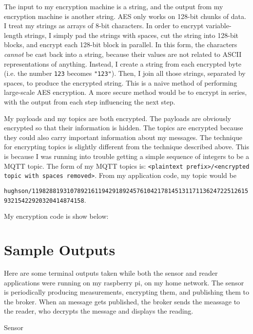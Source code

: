\documentclass[final,titlepage,onecolumn]{article}
\begin{document}
The input to my encryption machine is a string, and the output from my encryption machine is another string. AES only works on 128-bit chunks of data. I treat my strings as arrays of 8-bit characters.  In order to encrypt variable-length strings, I simply pad the strings with spaces, cut the string into 128-bit blocks, and encrypt each 128-bit block in parallel. In this form, the characters \emph{cannot} be cast back into a string, because their values are not related to ASCII representations of anything. Instead, I create a string from each encrypted byte (i.e. the number \texttt{123} becomes \texttt{"123"}). Then, I join all those strings, separated by spaces, to produce the encrypted string. This is a naive method of performing large-scale AES encryption. A more secure method would be to encrypt in series, with the output from each step influencing the next step.

My payloads and my topics are both encrypted. The payloads are obviously encrypted so that their information is hidden. The topics are encrypted because they could also carry important information about my messages. The technique for encrypting topics is slightly different from the technique described above. This is because I was running into trouble getting a simple sequence of integers to be a MQTT topic. The form of my MQTT topics is: \texttt{<plaintext prefix>/<encrypted topic with spaces removed>}. From my application code, my topic would be

\texttt{hughson/1198288193107892161194291892457610421781451311711362472251261593215422920320414874158}.

My encryption code is show below:
\lstset{style=Cpp}


\section{Sample Outputs}

Here are some terminal outputs taken while both the sensor and reader applications were running on my raspberry pi, on my home network. The sensor is periodically producing measurements, encrypting them, and publishing them to the broker. When an message gets published, the broker sends the meassage to the reader, who decrypts the message and displays the reading.

\begin{center}Sensor\end{center}
\lstset{style=None}

\end{document}
